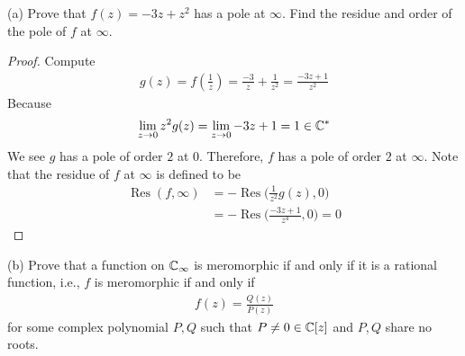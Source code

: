 \documentclass{report}
\begin{document}
\begin{question}{}{}
(a) Prove that $f(z)=-3z+z^2$ has a pole at $\infty$. Find the residue and order of the pole of $f$ at  $\infty$. 
\end{question}
\begin{proof}
Compute 
\begin{align*}
g(z)= f(\frac{1}{z})= \frac{-3}{z}+ \frac{1}{z^2}= \frac{-3z+1}{z^2}
\end{align*}
Because 
\begin{align*}
\lim_{z\to 0}z^2 g(z)= \lim_{z\to 0} -3z+1 =1 \in\mathbb{C}^* 
\end{align*}
We see $g$ has a pole of order $2$ at  $0$. Therefore,  $f$ has a pole of order $2$ at $\infty$. Note that the residue of $f$ at $\infty$ is defined to be  
\begin{align*}
  \operatorname{Res}(f,\infty)&=  - \operatorname{Res}\Big(\frac{1}{z^2}g(z),0\Big) \\
  &= - \operatorname{Res}\Big(\frac{-3z+1}{z^4},0\Big)=0 
\end{align*}
\end{proof}
\begin{question}{}{}
  (b) Prove that a function on $\mathbb{C}_{\infty}$ is meromorphic if and only if it is a rational function, i.e., $f$ is meromorphic if and only if 
   \begin{align*}
  f(z)= \frac{Q(z)}{P(z)}
  \end{align*}
for some complex polynomial $P,Q$ such that $P\neq 0 \in \mathbb{C} [z]$  and $P,Q$ share no roots. 
\end{question}
\end{document}
